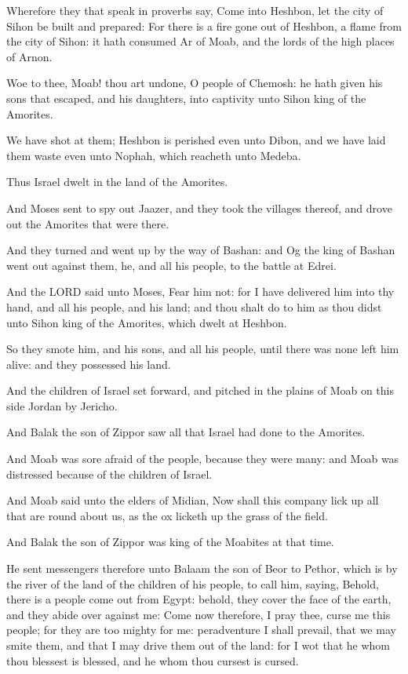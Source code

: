 \Verse Wherefore they that speak in proverbs say, Come into Heshbon,
let the city of Sihon be built and prepared: \Verse For there is a fire
gone out of Heshbon, a flame from the city of Sihon: it hath consumed
Ar of Moab, and the lords of the high places of Arnon.

\Verse Woe to thee, Moab! thou art undone, O people of Chemosh: he hath
given his sons that escaped, and his daughters, into captivity unto
Sihon king of the Amorites.

\Verse We have shot at them; Heshbon is perished even unto Dibon, and
we have laid them waste even unto Nophah, which reacheth unto Medeba.

\Verse Thus Israel dwelt in the land of the Amorites.

\Verse And Moses sent to spy out Jaazer, and they took the villages
thereof, and drove out the Amorites that were there.

\Verse And they turned and went up by the way of Bashan: and Og the
king of Bashan went out against them, he, and all his people, to the
battle at Edrei.

\Verse And the LORD said unto Moses, Fear him not: for I have delivered
him into thy hand, and all his people, and his land; and thou shalt do
to him as thou didst unto Sihon king of the Amorites, which dwelt at
Heshbon.

\Verse So they smote him, and his sons, and all his people, until there
was none left him alive: and they possessed his land.


\Chapter
\Verse And the children of Israel set forward, and pitched in the plains
of Moab on this side Jordan by Jericho.

\Verse And Balak the son of Zippor saw all that Israel had done to the
Amorites.

\Verse And Moab was sore afraid of the people, because they were many:
and Moab was distressed because of the children of Israel.

\Verse And Moab said unto the elders of Midian, Now shall this company
lick up all that are round about us, as the ox licketh up the grass of
the field.

And Balak the son of Zippor was king of the Moabites at that time.

\Verse He sent messengers therefore unto Balaam the son of Beor to
Pethor, which is by the river of the land of the children of his
people, to call him, saying, Behold, there is a people come out from
Egypt: behold, they cover the face of the earth, and they abide over
against me: \Verse Come now therefore, I pray thee, curse me this
people; for they are too mighty for me: peradventure I shall prevail,
that we may smite them, and that I may drive them out of the land: for
I wot that he whom thou blessest is blessed, and he whom thou cursest
is cursed.

